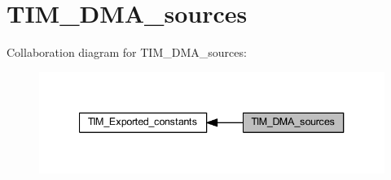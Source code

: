 \hypertarget{group___t_i_m___d_m_a__sources}{}\section{T\+I\+M\+\_\+\+D\+M\+A\+\_\+sources}
\label{group___t_i_m___d_m_a__sources}
Collaboration diagram for T\+I\+M\+\_\+\+D\+M\+A\+\_\+sources\+:
\nopagebreak
\begin{figure}[H]
\begin{center}
\leavevmode
\includegraphics[width=340pt]{group___t_i_m___d_m_a__sources}
\end{center}
\end{figure}
